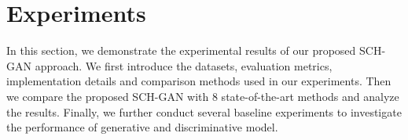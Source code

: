 \documentclass[journal]{IEEEtran}
\begin{document}

\section{Experiments}
In this section, we demonstrate the experimental results of our proposed SCH-GAN approach. We first introduce the datasets, evaluation metrics, implementation details and comparison methods used in our experiments. Then we compare the proposed SCH-GAN with 8 state-of-the-art methods and analyze the results. Finally, we further conduct several baseline experiments to investigate the performance of generative and discriminative model.
\end{document}
